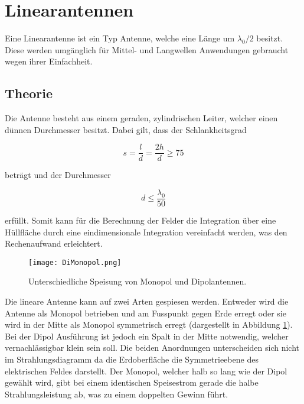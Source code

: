 \section{Linearantennen}

Eine Linearantenne ist ein Typ Antenne, welche eine Länge um $\lambda_0/2$ besitzt. Diese werden umgänglich für Mittel- und Langwellen Anwendungen gebraucht wegen ihrer Einfachheit. 

\subsection{Theorie}\label{sec:LinTheo}

Die Antenne besteht aus einem geraden, zylindrischen Leiter, welcher einen dünnen Durchmesser besitzt. Dabei gilt, dass der Schlankheitsgrad

\begin{equation}
s = \frac{l}{d}=\frac{2h}{d} \geq 75
\end{equation} 

beträgt und der Durchmesser

\begin{equation}
d \leq \frac{\lambda_0}{50}
\end{equation}

erfüllt. Somit kann für die Berechnung der Felder die Integration über eine Hüllfläche durch eine eindimensionale Integration vereinfacht werden, was den Rechenaufwand erleichtert.

\begin{figure}[!ht]
	\centering
    \texttt{[image: DiMonopol.png]}
    \caption{Unterschiedliche Speisung von Monopol und Dipolantennen.}
    \label{fig:DiMonopol}
\end{figure}

Die lineare Antenne kann auf zwei Arten gespiesen werden. Entweder wird die Antenne als Monopol betrieben und am Fusspunkt gegen Erde erregt oder sie wird in der Mitte als Monopol symmetrisch erregt (dargestellt in Abbildung \ref{fig:DiMonopol}). Bei der Dipol Ausführung ist jedoch ein Spalt in der Mitte notwendig, welcher vernachlässigbar klein sein soll. Die beiden Anordnungen unterscheiden sich nicht im Strahlungsdiagramm da die Erdoberfläche die Symmetrieebene des elektrischen Feldes darstellt. Der Monopol, welcher halb so lang wie der Dipol gewählt wird, gibt bei einem identischen Speisestrom gerade die halbe Strahlungsleistung ab, was zu einem doppelten Gewinn führt.\\

